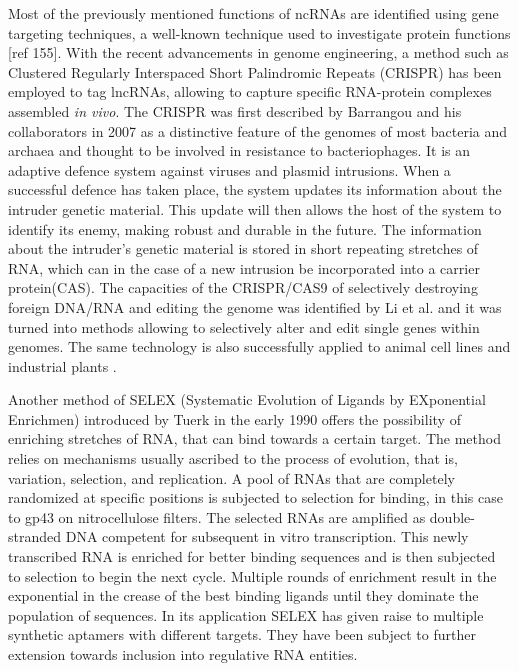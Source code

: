 Most of the previously mentioned functions of ncRNAs are identified using gene targeting techniques, a well-known technique used to investigate protein functions [ref 155].  With the recent advancements in genome engineering, a method such as Clustered Regularly Interspaced Short Palindromic Repeats (CRISPR) has been employed to tag lncRNAs, allowing to capture specific RNA-protein complexes assembled \textit{in vivo}. The CRISPR \cite{barrangou2007crispr} was first described by Barrangou and his collaborators in 2007 as a distinctive feature of the genomes of most bacteria and archaea and thought to be involved in resistance to bacteriophages. It is an adaptive defence system against viruses and plasmid intrusions. When a successful defence has taken place, the system updates its information about the intruder genetic material. This update will then allows the host of the system to identify its enemy, making robust and durable in the future. The information about the intruder’s genetic material is stored in short repeating stretches of RNA, which can in the case of a new intrusion be incorporated into a carrier protein(CAS). The capacities of the  CRISPR/CAS9 of selectively destroying foreign DNA/RNA and editing the genome was identified by Li et al. \cite{li2016harnessing} and it was turned into methods allowing to selectively alter and edit single genes within genomes. The same technology is also successfully applied to animal cell lines \cite{hwang2013efficient, jinek2013rna, wang2013one} and industrial plants \cite{svitashev2015targeted,li2015cas9}. 

Another method of SELEX (Systematic Evolution of Ligands by EXponential Enrichmen) \cite{tuerk1990systematic} introduced by Tuerk in the early 1990 offers the possibility of enriching stretches of RNA, that can bind towards a certain target. The method relies on mechanisms usually ascribed to the process of evolution, that is, variation, selection, and replication. A pool of RNAs that are completely randomized at specific positions is subjected to selection for binding, in this case to gp43 on nitrocellulose filters. The selected RNAs are amplified as double-stranded DNA competent for subsequent in vitro transcription. This newly transcribed RNA is enriched for better binding sequences and is then subjected to selection to begin the next cycle. Multiple rounds of enrichment result in the exponential in the crease of the best binding ligands until they dominate the population of sequences. In its application SELEX has given raise to multiple synthetic aptamers with different targets. They have been subject to further extension towards inclusion into regulative RNA entities.

